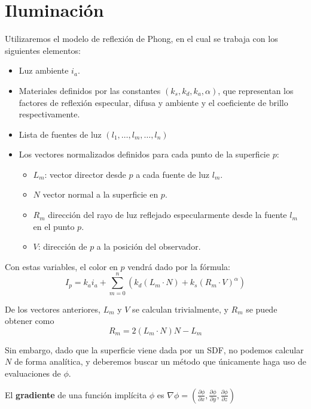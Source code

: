\section{Iluminación}
Utilizaremos el modelo de reflexión de Phong, en el cual se trabaja con los siguientes elementos:
\begin{itemize}
    \item Luz ambiente $i_a$.
    \item Materiales definidos por las constantes $(k_s, k_d, k_a, \alpha)$, que representan los factores de reflexión especular, difusa y ambiente y el coeficiente de brillo respectivamente.
    \item Lista de fuentes de luz $(l_1, \dots, l_m, \dots, l_n)$
    \item Los vectores normalizados definidos para cada punto de la superficie $p$:
          \begin{itemize}
              \item $L_m$: vector director desde $p$ a cada fuente de luz $l_m$.
              \item $N$ vector normal a la superficie en $p$.
              \item $R_m$ dirección del rayo de luz reflejado especularmente desde la fuente $l_m$ en el punto $p$.
              \item $V$: dirección de $p$ a la posición del observador.
          \end{itemize}
\end{itemize}

Con estas variables, el color en $p$ vendrá dado por la fórmula:
\begin{equation*}
    I_p = k_a i_a + \sum_{m=0}^{n} \left(k_d\left(L_m\cdot N\right) + k_s\left(R_m\cdot V\right)^{\alpha} \right)
\end{equation*}

De los vectores anteriores, $L_m$ y $V$ se calculan trivialmente, y $R_m$ se puede obtener como
\begin{equation*}
    R_m = 2(L_m\cdot N)N - L_m
\end{equation*}

Sin embargo, dado que la superficie viene dada por un SDF, no podemos calcular $N$ de forma analítica, y deberemos buscar un método que únicamente haga uso de evaluaciones de $\phi$.

\begin{definicion}
    El \textbf{gradiente} de una función implícita $\phi$ es $\nabla\phi = \left(\frac{\partial \phi}{\partial x}, \frac{\partial \phi}{\partial y}, \frac{\partial \phi}{\partial z}\right)$
\end{definicion}

